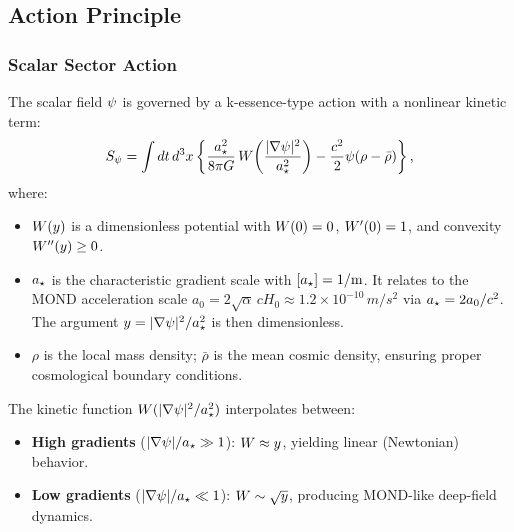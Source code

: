 \subsection{Action Principle}\label{sec:action}

\subsubsection{Scalar Sector Action}

The scalar field $\psi$ is governed by a k-essence-type action with 
a nonlinear kinetic term:
\begin{equation}
S_\psi = \int dt\,d^3x \left\{ 
  \frac{a_\star^2}{8\pi G}\,W\!\left(\frac{|\nabla\psi|^2}{a_\star^2}\right) 
  - \frac{c^2}{2}\psi(\rho - \bar{\rho}) 
\right\},
\label{eq:action_scalar}
\end{equation}
where:
\begin{itemize}
\item $W(y)$ is a dimensionless potential with $W(0) = 0$, 
$W'(0) = 1$, and convexity $W''(y) \geq 0$.
\item $a_\star$ is the characteristic gradient scale with $[a_\star] = 1/\text{m}$. 
It relates to the MOND acceleration scale $a_0 = 2\sqrt{\alpha}\,cH_0 \approx 1.2 \times 10^{-10}\,\si{m/s^2}$ via 
$a_\star = 2a_0/c^2$. The argument $y = |\nabla\psi|^2/a_\star^2$ is then dimensionless.
\item $\rho$ is the local mass density; $\bar{\rho}$ is the mean cosmic 
density, ensuring proper cosmological boundary conditions.
\end{itemize}

The kinetic function $W(|\nabla\psi|^2/a_\star^2)$ interpolates between:
\begin{itemize}
\item \textbf{High gradients} ($|\nabla\psi|/a_\star \gg 1$): 
$W \approx y$, yielding linear (Newtonian) behavior.
\item \textbf{Low gradients} ($|\nabla\psi|/a_\star \ll 1$): 
$W \sim \sqrt{y}$, producing MOND-like deep-field dynamics.
\end{itemize}

